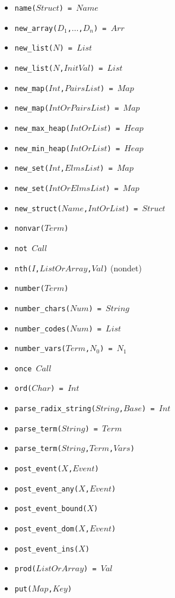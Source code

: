 \documentclass[10pt]{article}
\begin{document}
\begin{multicols}{2}
\begin{scriptsize}
\begin{itemize}
    \item \texttt{name($Struct$) = $Name$} 
    \item \texttt{new\_array($D_1$,$\ldots$,$D_n$) = $Arr$} 
    \item \texttt{new\_list($N$) = $List$} 
    \item \texttt{new\_list($N$,$InitVal$) = $List$} 
    \item \texttt{new\_map($Int$,$PairsList$) = $Map$} 
    \item \texttt{new\_map($IntOrPairsList$) = $Map$} 
    \item \texttt{new\_max\_heap($IntOrList$) = $Heap$}
    \item \texttt{new\_min\_heap($IntOrList$) = $Heap$}
    \item \texttt{new\_set($Int$,$ElmsList$) = $Map$} 
    \item \texttt{new\_set($IntOrElmsList$) = $Map$} 
    \item \texttt{new\_struct($Name$,$IntOrList$) = $Struct$} 
    \item \texttt{nonvar($Term$)} 
    \item \texttt{not $Call$}
    \item \texttt{nth($I$,$ListOrArray$,$Val$)} (nondet)
    \item \texttt{number($Term$)} 
    \item \texttt{number\_chars($Num$) = $String$} 
    \item \texttt{number\_codes($Num$) = $List$} 
    \item \texttt{number\_vars($Term$,$N_0$) = $N_1$}
    \item \texttt{once $Call$}
    \item \texttt{ord($Char$) = $Int$} 
    \item \texttt{parse\_radix\_string($String$,$Base$) = $Int$}
    \item \texttt{parse\_term($String$) = $Term$}
    \item \texttt{parse\_term($String$,$Term$,$Vars$)}
    \item \texttt{post\_event($X$,$Event$)}
    \item \texttt{post\_event\_any($X$,$Event$)}
    \item \texttt{post\_event\_bound($X$)}
    \item \texttt{post\_event\_dom($X$,$Event$)}
    \item \texttt{post\_event\_ins($X$)}
    \item \texttt{prod($ListOrArray$) = $Val$}
    \item \texttt{put($Map$,$Key$)} 

\end{itemize}
\end{scriptsize}
\end{multicols}
\end{document}
